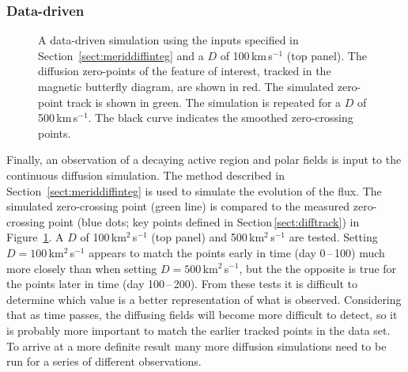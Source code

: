 \subsubsection{Data-driven}\label{sect:simdatdriv}

\begin{figure}[!t]
\caption[Data-driven diffusion simulations.]{A data-driven simulation using the inputs specified in Section~\ref{sect:meriddiffinteg} and a $D$ of 100\,km\,s$^{-1}$ (top panel). The diffusion zero-points of the feature of interest, tracked in the magnetic butterfly diagram, are shown in red. The simulated zero-point track is shown in green. The simulation is repeated for a $D$ of 500\,km\,s$^{-1}$. The black curve indicates the smoothed zero-crossing points.}
\label{fig:datasimcomp}
\end{figure}


Finally, an observation of a decaying active region and polar fields is input to the continuous diffusion simulation. The method described in Section~\ref{sect:meriddiffinteg} is used to simulate the evolution of the flux. The simulated zero-crossing point (green line) is compared to the measured zero-crossing point (blue dots; key points defined in Section\,\ref{sect:difftrack}) in Figure~\ref{fig:datasimcomp}. 
A $D$ of 100\,km$^2$\,s$^{-1}$ (top panel) and 500\,km$^2$\,s$^{-1}$ are tested. Setting $D=100$\,km$^2$\,s$^{-1}$ appears to match the points early in time (day 0\,--\,100) much more closely than when setting $D=500$\,km$^2$\,s$^{-1}$, but the the opposite is true for the points later in time (day 100\,--\,200). From these tests it is difficult to determine which value is a better representation of what is observed. Considering that as time passes, the diffusing fields will become more difficult to detect, so it is probably more important to match the earlier tracked points in the data set. To arrive at a more definite result many more diffusion simulations need to be run for a series of different observations.
 

